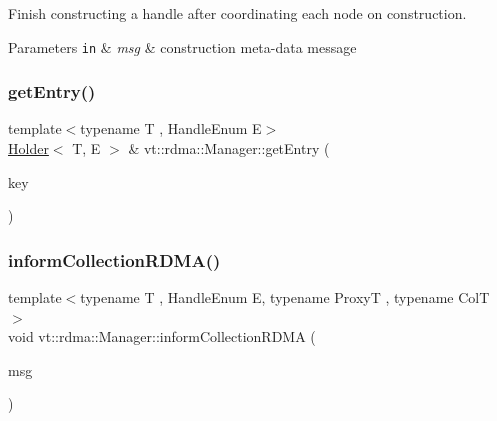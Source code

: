 Finish constructing a handle after coordinating each node on construction. 


\begin{DoxyParams}[1]{Parameters}
\mbox{\tt in}  & {\em msg} & construction meta-\/data message \\
\hline
\end{DoxyParams}
\mbox{\label{structvt_1_1rdma_1_1_manager_a60c463246971a6d782e55f13fd60d092}} 
\subsubsection{\texorpdfstring{get\+Entry()}{getEntry()}}
{\footnotesize\ttfamily template$<$typename T , Handle\+Enum E$>$ \\
\hyperlink{structvt_1_1rdma_1_1_holder}{Holder}$<$ T, E $>$ \& vt\+::rdma\+::\+Manager\+::get\+Entry (\begin{DoxyParamCaption}\item[{\hyperlink{structvt_1_1rdma_1_1_handle_key}{Handle\+Key} const \&}]{key }\end{DoxyParamCaption})}

\mbox{\label{structvt_1_1rdma_1_1_manager_a5dfbaf5c43691eaf3dcce5b14c4d8951}} 
\subsubsection{\texorpdfstring{inform\+Collection\+R\+D\+M\+A()}{informCollectionRDMA()}}
{\footnotesize\ttfamily template$<$typename T , Handle\+Enum E, typename ProxyT , typename ColT $>$ \\
void vt\+::rdma\+::\+Manager\+::inform\+Collection\+R\+D\+MA (\begin{DoxyParamCaption}\item[{\hyperlink{structvt_1_1rdma_1_1impl_1_1_inform_r_d_m_a_msg}{impl\+::\+Inform\+R\+D\+M\+A\+Msg}$<$ ProxyT, typename Col\+T\+::\+Index\+Type $>$ $\ast$}]{msg }\end{DoxyParamCaption})\hspace{0.3cm}{\ttfamily [private]}}



